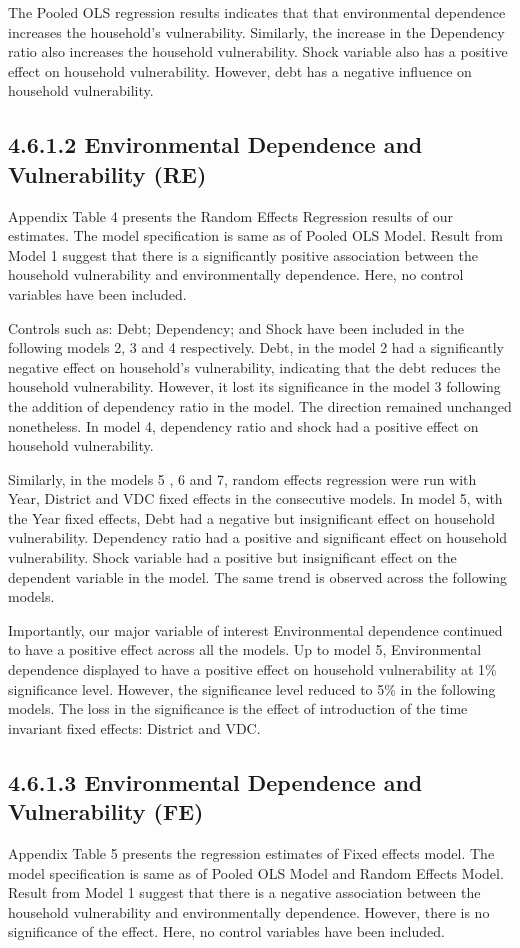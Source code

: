 \documentclass[12pt, a4paper]{article}
\begin{document}
The Pooled OLS regression results indicates that that environmental dependence increases the household's vulnerability. Similarly, the increase in the Dependency ratio also increases the household vulnerability. Shock variable also has a positive effect on household vulnerability. However, debt has a negative influence on household vulnerability.  
  
\subsection*{4.6.1.2 Environmental Dependence and Vulnerability (RE)}
Appendix Table 4 presents the Random Effects Regression results of our estimates. The model specification is same as of Pooled OLS Model. Result from Model 1 suggest that there is a significantly positive association between the household vulnerability and environmentally dependence. Here, no control variables have been included.  

Controls such as: Debt; Dependency; and Shock have been included in the following models 2, 3 and 4 respectively. Debt, in the model 2 had a significantly negative effect on household's vulnerability, indicating that the debt reduces the household vulnerability. However, it lost its significance in the model 3 following the addition of dependency ratio in the model. The direction remained unchanged nonetheless. In model 4, dependency ratio and shock had a positive effect on household vulnerability.

Similarly, in the models 5 , 6 and 7, random effects regression were run with Year, District and VDC fixed effects in the consecutive models. In model 5, with the Year fixed effects, Debt had a negative but insignificant effect on household vulnerability. Dependency ratio had a positive and significant effect on household vulnerability. Shock variable had a positive but insignificant effect on the dependent variable in the model. The same trend is observed across the following models. 

Importantly, our major variable of interest Environmental dependence continued to have a positive effect across all the models.  Up to model 5, Environmental dependence displayed to have a positive effect on household vulnerability at 1\% significance level. However, the significance level reduced to 5\% in the following models. The loss in the significance is the effect of introduction of the time invariant fixed effects: District and VDC.

\subsection*{4.6.1.3 Environmental Dependence and Vulnerability (FE)}
Appendix Table 5 presents the regression estimates of Fixed effects model. The model specification is same as of Pooled OLS Model and Random Effects Model. Result from Model 1 suggest that there is a negative association between the household vulnerability and environmentally dependence. However, there is no significance of the effect. Here, no control variables have been included.  
\end{document}
